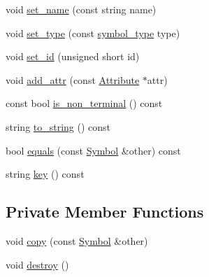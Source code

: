 \begin{CompactItemize}
void \hyperlink{classgenevalmag_1_1Symbol_257b4ff2e26d8c15d33e9ac6194f44fb}{set\_\-name} (const string name)
\item 
void \hyperlink{classgenevalmag_1_1Symbol_3c15ef8b10ef26b663a6eca6c2b81d7f}{set\_\-type} (const \hyperlink{namespacegenevalmag_4c1cf205cb145b09e46df5277bcc70c6}{symbol\_\-type} type)
\item 
void \hyperlink{classgenevalmag_1_1Symbol_997ca15803cde32380834a029d3609a7}{set\_\-id} (unsigned short id)
\item 
void \hyperlink{classgenevalmag_1_1Symbol_41ceb415014d2cfbb5976c3fd2bbf35f}{add\_\-attr} (const \hyperlink{classgenevalmag_1_1Attribute}{Attribute} $\ast$attr)
\item 
const bool \hyperlink{classgenevalmag_1_1Symbol_d44a494066886a7b83d4052367e8903b}{is\_\-non\_\-terminal} () const 
\item 
string \hyperlink{classgenevalmag_1_1Symbol_5f1d632b5fc5e04c731f3478fe90df18}{to\_\-string} () const 
\item 
bool \hyperlink{classgenevalmag_1_1Symbol_17e303be01f4c9cd3c1b167179d6e0aa}{equals} (const \hyperlink{classgenevalmag_1_1Symbol}{Symbol} \&other) const 
\item 
string \hyperlink{classgenevalmag_1_1Symbol_ab0679bd9e80cc86a1c6fccca3a4753c}{key} () const 
\end{CompactItemize}
\subsection*{Private Member Functions}
\begin{CompactItemize}
\item 
void \hyperlink{classgenevalmag_1_1Symbol_b5a286e23bc3f9eaecb153f829bf0b4a}{copy} (const \hyperlink{classgenevalmag_1_1Symbol}{Symbol} \&other)
\item 
void \hyperlink{classgenevalmag_1_1Symbol_6c95a923ca2c9d07903fca9b0bd4cacb}{destroy} ()
\end{CompactItemize}

